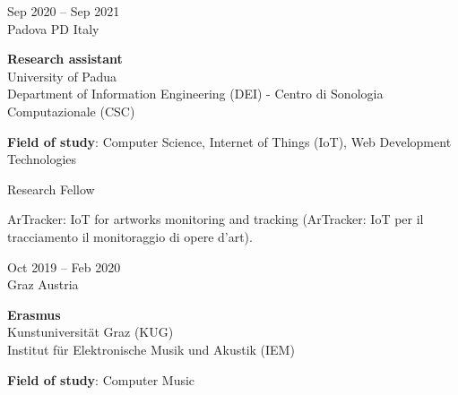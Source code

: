 \documentclass[7pt,a4paper]{article}
\begin{document}
\begin{mdframed}[
    backgroundcolor=white,
    linecolor=white,
    linewidth=0pt,
    innerleftmargin=6pt,
    innerrightmargin=6pt,
    innertopmargin=6pt,
    innerbottommargin=6pt,
    skipabove=0pt,
    skipbelow=0pt
]

\begin{minipage}[t]{0.28\textwidth}

Sep 2020 – Sep 2021
\\\scriptsize Padova PD Italy

\end{minipage}
\begin{minipage}[t]{0.68\textwidth}
\normalsize
\textbf{Research assistant}\\
University of Padua
\\ \small Department of Information Engineering (DEI) - Centro di Sonologia Computazionale (CSC)
\par \vspace{0.1cm} 

\par \scriptsize \textbf{Field of study}: Computer Science, Internet of Things (IoT), Web Development Technologies
 

\scriptsize Research Fellow

\scriptsize ArTracker: IoT for artworks monitoring and tracking (ArTracker: IoT per il tracciamento il monitoraggio di opere d'art).

\end{minipage}
\vspace{0.25cm}
\end{mdframed}


\begin{mdframed}[
    backgroundcolor=entrygray,
    linecolor=entrygray,
    linewidth=0pt,
    innerleftmargin=6pt,
    innerrightmargin=6pt,
    innertopmargin=6pt,
    innerbottommargin=6pt,
    skipabove=0pt,
    skipbelow=0pt
]

\begin{minipage}[t]{0.28\textwidth}

Oct 2019 – Feb 2020
\\\scriptsize Graz Austria

\end{minipage}
\begin{minipage}[t]{0.68\textwidth}
\normalsize
\textbf{Erasmus}\\
Kunstuniversität Graz (KUG)
\\ \small Institut für Elektronische Musik und Akustik (IEM)
\par \vspace{0.1cm} 

\par \scriptsize \textbf{Field of study}: Computer Music
 

\end{minipage}
\vspace{0.25cm}
\end{mdframed}
\end{document}
